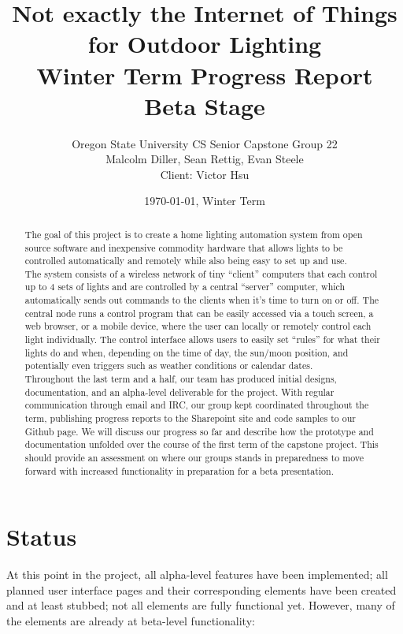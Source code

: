 \documentclass[10pt,draftclsnofoot,onecolumn]{IEEEtran}
\title{Not exactly the Internet of Things for Outdoor Lighting\\ Winter Term Progress Report\\ Beta Stage}
\author{Oregon State University CS Senior Capstone Group 22\\Malcolm Diller, Sean Rettig, Evan Steele\\Client: Victor Hsu}
\date{\today, Winter Term}
\begin{document}
\maketitle
\begin{abstract}
The goal of this project is to create a home lighting automation system from
open source software and inexpensive commodity hardware that allows lights to
be controlled automatically and remotely while also being easy to set up and
use.\\

The system consists of a wireless network of tiny ``client'' computers that
each control up to 4 sets of lights and are controlled by a central ``server''
computer, which automatically sends out commands to the clients when it's
time to turn on or off.  The central node runs a control program that can
be easily accessed via a touch screen, a web browser, or a mobile device, where
the user can locally or remotely control each light individually. The control
interface allows users to easily set ``rules'' for what their lights do and
when, depending on the time of day, the sun/moon position, and potentially even
triggers such as weather conditions or calendar dates.\\

Throughout the last term and a half, our team has produced initial designs,
documentation, and an alpha-level deliverable for the project.  With regular
communication through email and IRC, our group kept coordinated throughout the
term, publishing progress reports to the Sharepoint site and code samples to
our Github page. We will discuss our progress so far and describe how the
prototype and documentation unfolded over the course of the first term of the
capstone project. This should provide an assessment on where our groups stands
in preparedness to move forward with increased functionality in preparation for
a beta presentation.
\end{abstract}
\pagebreak
\tableofcontents
\newpage
{}

\section{Status}

At this point in the project, all alpha-level features have been implemented;
all planned user interface pages and their corresponding elements have been
created and at least stubbed; not all elements are fully functional yet.
However, many of the elements are already at beta-level functionality:
\end{document}
